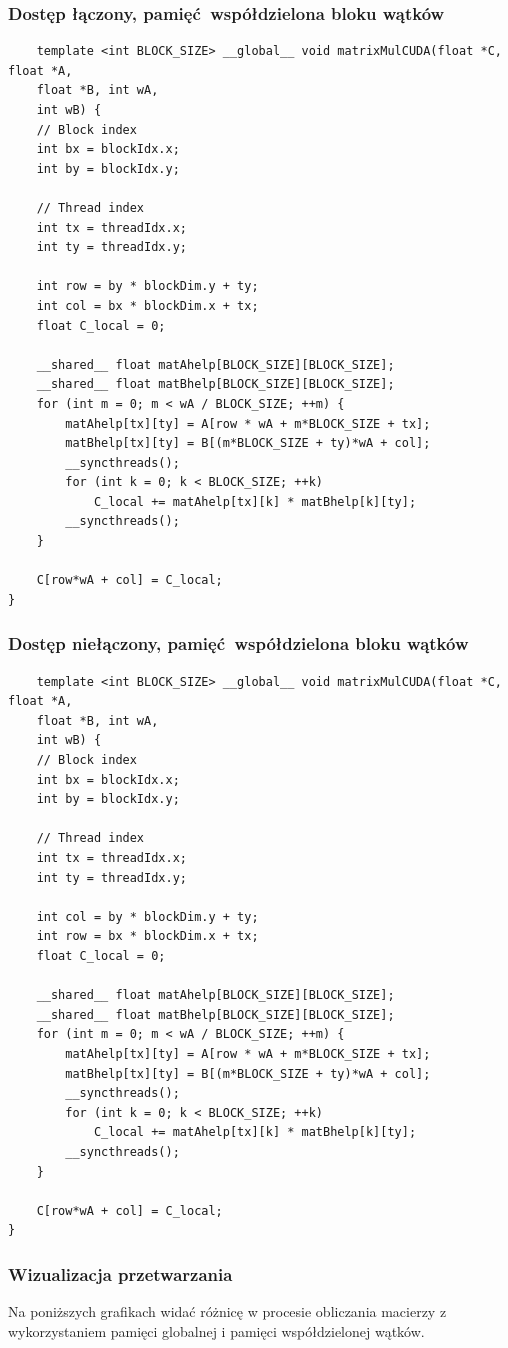 \documentclass[10pt,a4paper]{article}
\begin{document}
\subsubsection*{Dostęp łączony, pamięć współdzielona bloku wątków}
\begin{lstlisting}
	template <int BLOCK_SIZE> __global__ void matrixMulCUDA(float *C, float *A,
	float *B, int wA,
	int wB) {
	// Block index
	int bx = blockIdx.x;
	int by = blockIdx.y;

	// Thread index
	int tx = threadIdx.x;
	int ty = threadIdx.y;

	int row = by * blockDim.y + ty;
	int col = bx * blockDim.x + tx;
	float C_local = 0;

	__shared__ float matAhelp[BLOCK_SIZE][BLOCK_SIZE];
	__shared__ float matBhelp[BLOCK_SIZE][BLOCK_SIZE];
	for (int m = 0; m < wA / BLOCK_SIZE; ++m) {
		matAhelp[tx][ty] = A[row * wA + m*BLOCK_SIZE + tx];
		matBhelp[tx][ty] = B[(m*BLOCK_SIZE + ty)*wA + col];
		__syncthreads();
		for (int k = 0; k < BLOCK_SIZE; ++k)
			C_local += matAhelp[tx][k] * matBhelp[k][ty];
		__syncthreads();
	}

	C[row*wA + col] = C_local;
}
\end{lstlisting}

\subsubsection*{Dostęp niełączony, pamięć współdzielona bloku wątków}
\begin{lstlisting}
	template <int BLOCK_SIZE> __global__ void matrixMulCUDA(float *C, float *A,
	float *B, int wA,
	int wB) {
	// Block index
	int bx = blockIdx.x;
	int by = blockIdx.y;

	// Thread index
	int tx = threadIdx.x;
	int ty = threadIdx.y;

	int col = by * blockDim.y + ty;
	int row = bx * blockDim.x + tx;
	float C_local = 0;

	__shared__ float matAhelp[BLOCK_SIZE][BLOCK_SIZE];
	__shared__ float matBhelp[BLOCK_SIZE][BLOCK_SIZE];
	for (int m = 0; m < wA / BLOCK_SIZE; ++m) {
		matAhelp[tx][ty] = A[row * wA + m*BLOCK_SIZE + tx];
		matBhelp[tx][ty] = B[(m*BLOCK_SIZE + ty)*wA + col];
		__syncthreads();
		for (int k = 0; k < BLOCK_SIZE; ++k)
			C_local += matAhelp[tx][k] * matBhelp[k][ty];
		__syncthreads();
	}

	C[row*wA + col] = C_local;
}
\end{lstlisting}

\subsubsection*{Wizualizacja przetwarzania}
Na poniższych grafikach widać różnicę w procesie obliczania macierzy z wykorzystaniem
pamięci globalnej i pamięci współdzielonej wątków.\\
\end{document}
